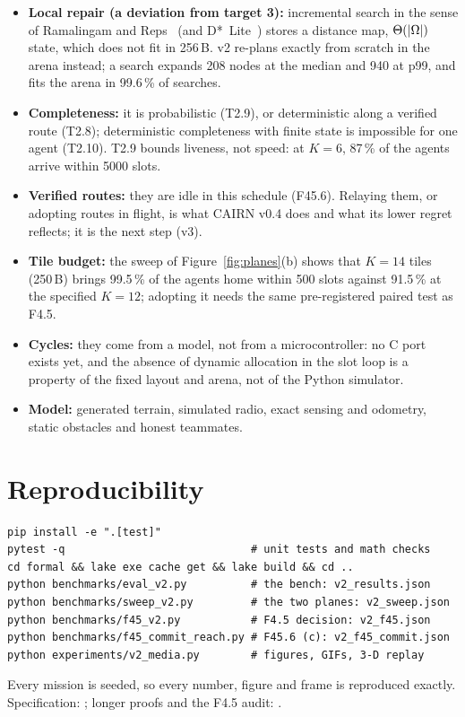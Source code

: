 \documentclass[11pt,a4paper]{article}
\newcommand{\code}[1]{\texttt{\detokenize{#1}}}
\DeclarePairedDelimiter\abs{\lvert}{\rvert}
\begin{document}
\begin{itemize}
\item \textbf{Local repair (a deviation from target 3):} incremental search in the sense of Ramalingam and
Reps~\cite{rr96} (and D*~Lite~\cite{dstarlite}) stores a distance map, $\Theta(\abs\Omega)$ state, which does not fit in
256\,B. v2 re-plans exactly from scratch in the arena instead; a search expands 208 nodes at the median and 940 at
p99, and fits the arena in 99.6\,\% of searches.
\item \textbf{Completeness:} it is probabilistic (T2.9), or deterministic along a verified route (T2.8); deterministic
completeness with finite state is impossible for one agent (T2.10). T2.9 bounds liveness, not speed: at $K=6$,
87\,\% of the agents arrive within 5000 slots.
\item \textbf{Verified routes:} they are idle in this schedule (F45.6). Relaying them, or adopting routes in flight, is
what CAIRN v0.4 does and what its lower regret reflects; it is the next step (v3).
\item \textbf{Tile budget:} the sweep of Figure~\ref{fig:planes}(b) shows that $K=14$ tiles (250\,B) brings 99.5\,\% of
the agents home within 500 slots against 91.5\,\% at the specified $K=12$; adopting it needs the same pre-registered
paired test as F4.5.
\item \textbf{Cycles:} they come from a model, not from a microcontroller: no C port exists yet, and the absence of
dynamic allocation in the slot loop is a property of the fixed layout and arena, not of the Python simulator.
\item \textbf{Model:} generated terrain, simulated radio, exact sensing and odometry, static obstacles and honest
teammates.
\end{itemize}

\section{Reproducibility}

\begin{verbatim}
pip install -e ".[test]"
pytest -q                             # unit tests and math checks
cd formal && lake exe cache get && lake build && cd ..
python benchmarks/eval_v2.py          # the bench: v2_results.json
python benchmarks/sweep_v2.py         # the two planes: v2_sweep.json
python benchmarks/f45_v2.py           # F4.5 decision: v2_f45.json
python benchmarks/f45_commit_reach.py # F45.6 (c): v2_f45_commit.json
python experiments/v2_media.py        # figures, GIFs, 3-D replay
\end{verbatim}
Every mission is seeded, so every number, figure and frame is reproduced exactly. Specification:
\code{docs/v2_spec.md}; longer proofs and the F4.5 audit: \code{docs/v2_proofs.md}.
\end{document}
